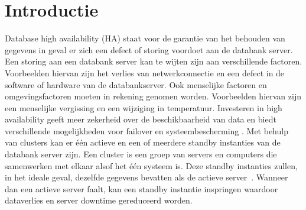 \section{Introductie} %
\label{sec:introductie}
Database high availability (HA) staat voor de garantie van het behouden van gegevens in geval er zich een defect of storing voordoet aan de databank  server. Een storing aan een databank server kan te wijten zijn aan verschillende factoren. Voorbeelden hiervan zijn het verlies van netwerkconnectie en een defect in de software of hardware van de databankserver. Ook menselijke factoren en omgevingsfactoren moeten in rekening genomen worden. Voorbeelden hiervan zijn een menselijke vergissing en een wijziging in temperatuur. Investeren in high availability geeft meer zekerheid over de beschikbaarheid van data en biedt verschillende mogelijkheden voor failover en systeembescherming \autocite{IBM1}. Met behulp van clusters kan er één actieve en een of meerdere standby instanties van de databank server zijn. Een cluster is een groep van servers en computers die samenwerken met elkaar alsof het één systeem is. Deze standby instanties zullen, in het ideale geval, dezelfde gegevens bevatten als de actieve server~\autocite{BDQ}. Wanneer dan een actieve server faalt, kan een standby instantie inspringen waardoor dataverlies en server downtime gereduceerd worden.




